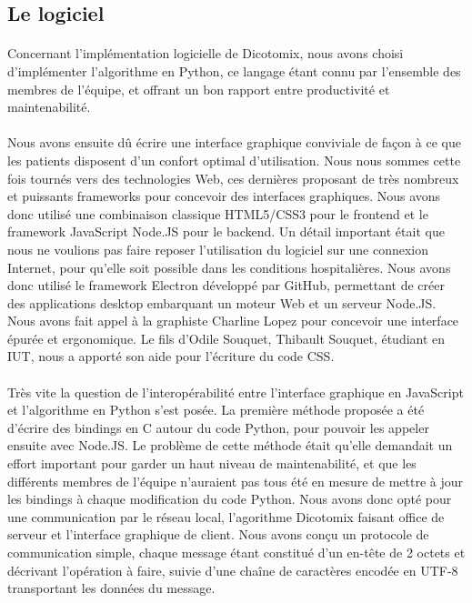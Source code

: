 \documentclass[11pt,a4paper]{article}
\theoremstyle{plain}
\theoremstyle{definition}
\begin{document}
\subsection{Le logiciel}
\paragraph{}Concernant l'implémentation logicielle de Dicotomix, nous avons choisi d'implémenter l'algorithme en Python, ce langage étant connu par l'ensemble des membres de l'équipe, et offrant un bon rapport entre productivité et maintenabilité.

\paragraph{}Nous avons ensuite dû écrire une interface graphique conviviale de façon à ce que les patients disposent d'un confort optimal d'utilisation. Nous nous sommes cette fois tournés vers des technologies Web, ces dernières proposant de très nombreux et puissants frameworks pour concevoir des interfaces graphiques. Nous avons donc utilisé une combinaison classique HTML5/CSS3 pour le frontend et le framework JavaScript Node.JS pour le backend. Un détail important était que nous ne voulions pas faire reposer l'utilisation du logiciel sur une connexion Internet, pour qu'elle soit possible dans les conditions hospitalières. Nous avons donc utilisé le framework Electron développé par GitHub, permettant de créer des applications desktop embarquant un moteur Web et un serveur Node.JS. Nous avons fait appel à la graphiste Charline Lopez pour concevoir une interface épurée et ergonomique. Le fils d'Odile Souquet, Thibault Souquet, étudiant en IUT, nous a apporté son aide pour l'écriture du code CSS.

\paragraph{}Très vite la question de l'interopérabilité entre l'interface graphique en JavaScript et l'algorithme en Python s'est posée. La première méthode proposée a été d'écrire des bindings en C autour du code Python, pour pouvoir les appeler ensuite avec Node.JS. Le problème de cette méthode était qu'elle demandait un effort important pour garder un haut niveau de maintenabilité, et que les différents membres de l'équipe n'auraient pas tous été en mesure de mettre à jour les bindings à chaque modification du code Python. Nous avons donc opté pour une communication par le réseau local, l'agorithme Dicotomix faisant office de serveur et l'interface graphique de client. Nous avons conçu un protocole de communication simple, chaque message étant constitué d'un en-tête de 2 octets et décrivant l'opération à faire, suivie d'une chaîne de caractères encodée en UTF-8 transportant les données du message.
\end{document}

